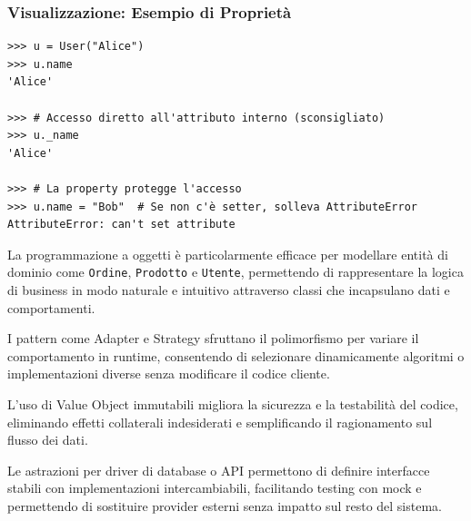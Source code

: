 \subsubsection{Visualizzazione: Esempio di Proprietà}
\begin{tcolorbox}[title=Output Terminale, colback=black!5, colframe=gray!50]
\begin{lstlisting}[style=python]
>>> u = User("Alice")
>>> u.name
'Alice'

>>> # Accesso diretto all'attributo interno (sconsigliato)
>>> u._name
'Alice'

>>> # La property protegge l'accesso
>>> u.name = "Bob"  # Se non c'è setter, solleva AttributeError
AttributeError: can't set attribute
\end{lstlisting}
\end{tcolorbox}

\begin{tcolorbox}[title=Casi d'uso]
La programmazione a oggetti è particolarmente efficace per modellare entità di dominio come \texttt{Ordine}, \texttt{Prodotto} e \texttt{Utente}, permettendo di rappresentare la logica di business in modo naturale e intuitivo attraverso classi che incapsulano dati e comportamenti.

I pattern come Adapter e Strategy sfruttano il polimorfismo per variare il comportamento in runtime, consentendo di selezionare dinamicamente algoritmi o implementazioni diverse senza modificare il codice cliente.

L'uso di Value Object immutabili migliora la sicurezza e la testabilità del codice, eliminando effetti collaterali indesiderati e semplificando il ragionamento sul flusso dei dati.

Le astrazioni per driver di database o API permettono di definire interfacce stabili con implementazioni intercambiabili, facilitando testing con mock e permettendo di sostituire provider esterni senza impatto sul resto del sistema.
\end{tcolorbox}

